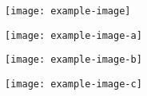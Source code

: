 \documentclass{article}
\begin{document}
\thispagestyle{empty}

\texttt{[image: example-image]}

\vfill

\texttt{[image: example-image-a]}

\clearpage

\thispagestyle{empty}

\texttt{[image: example-image-b]}

\vfill

\texttt{[image: example-image-c]}
\end{document}
